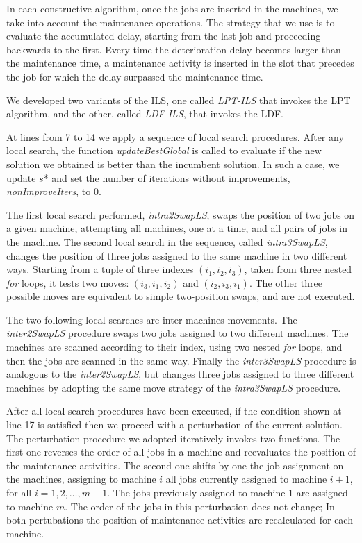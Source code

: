 \documentclass[a4paper,11pt]{article}
\begin{document}
In each constructive algorithm, once the jobs are inserted in the machines, we take into account the maintenance operations. The strategy that we use is to evaluate the accumulated delay, starting from the last job and proceeding backwards to the first. Every time the deterioration delay becomes larger than the maintenance time, a maintenance activity is inserted in the slot that precedes the job for which the delay surpassed the maintenance time. 

We developed two variants of the ILS, one called \emph{LPT-ILS} that invokes the LPT algorithm, and the other, called \emph{LDF-ILS}, that invokes the LDF. 

At lines from 7 to 14 we apply a sequence of local search procedures. After any local search, the function \emph{updateBestGlobal} is called to evaluate if the new solution we obtained is better than the incumbent solution. In such a case, we update $s$* and set the number of iterations without improvements, \emph{nonImproveIters}, to 0.

The first local search performed, \emph{intra2SwapLS}, swaps the position of two jobs on a given machine, attempting all machines, one at a time, and all pairs of jobs in the machine. 
The second local search in the sequence, called \emph{intra3SwapLS}, changes the position of three jobs assigned to the same machine in two different ways. Starting from a tuple of three indexes $(i_1, i_2, i_3)$, taken from three nested \emph{for} loops, it tests two moves: $(i_3, i_1, i_2)$ and $(i_2, i_3,i_1)$. The other three possible moves are equivalent to simple two-position swaps, and are not executed. %

The two following local searches are inter-machines movements. The \emph{inter2SwapLS} procedure swaps two jobs assigned to two different machines. The machines are scanned according to their index, using two nested \emph{for} loops, and then the jobs are scanned in the same way. 
Finally the \emph{inter3SwapLS} procedure is analogous to the \emph{inter2SwapLS}, but changes three jobs assigned to three different machines by adopting the same move strategy of the \emph{intra3SwapLS} procedure. 

After all local search procedures have been executed, if the condition shown at line 17 is satisfied then we proceed with a perturbation of the current solution. 
The perturbation procedure we adopted iteratively invokes two functions. The first one reverses the order of all jobs in a machine and reevaluates the position of the maintenance activities. The second one shifts by one the job assignment on the machines, assigning to machine $i$ all jobs currently assigned to machine $i+1$, for all $i = 1, 2, \dots, m-1$. The jobs previously assigned to machine 1 are assigned to machine $m$. The order of the jobs in this perturbation does not change; In both pertubations the position of maintenance activities are recalculated for each machine.  
\end{document}
